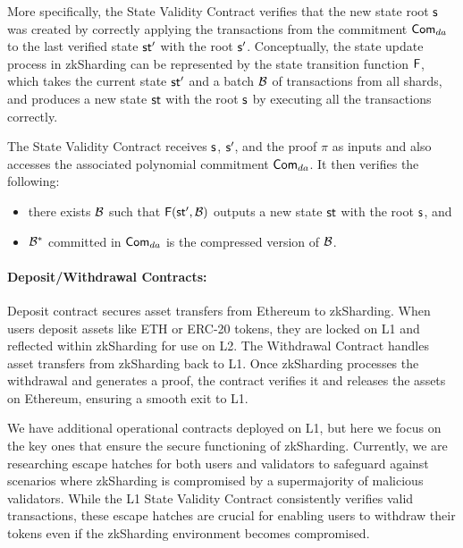 More specifically, the State Validity Contract verifies that the new state
root $\mathsf{s}$ was created by correctly applying the transactions from the
commitment $\mathsf{Com}_{da}$ to the last verified state $\mathsf{st}'$ with the root
$\mathsf{s}'$. Conceptually, the state update process in zkSharding can be
represented by the state transition function $\mathsf{F}$, which takes the
current state $\mathsf{st}'$ and a batch $\mathcal{B}$ of transactions from all shards,
and produces a new state $\mathsf{st}$ with the root $\mathsf{s}$ by executing all
the transactions correctly.

The State Validity Contract receives $\mathsf{s}$, $\mathsf{s}'$, and the proof
$\pi$ as inputs and also accesses the associated polynomial commitment
$\mathsf{Com}_{da}$. It then verifies the following:

\begin{itemize}
	\item there exists $\mathcal{B}$ such that $\mathsf{F}(\mathsf{st}', \mathcal{B})$
	      outputs a new state $\mathsf{st}$ with the root $\mathsf{s}$, and
	\item $\mathcal{B}^*$ committed in $\mathsf{Com}_{da}$ is the compressed version of
	      $\mathcal{B}$.
\end{itemize}

\paragraph{Deposit/Withdrawal Contracts:}
Deposit contract secures asset transfers from Ethereum to
zkSharding.
When users deposit assets like ETH or ERC-20 tokens, they are
locked on L1
and reflected within zkSharding for use on L2.
The Withdrawal Contract handles asset transfers from zkSharding
back to L1. Once zkSharding processes the withdrawal and generates
a
proof, the contract verifies it and releases the assets on
Ethereum,
ensuring a smooth exit to L1.

We have additional operational contracts deployed on L1, but here we focus
on the key ones that ensure the secure functioning of zkSharding.
\short{
}
{
	Currently, we are researching escape hatches for both users and
	validators
	to safeguard against scenarios where zkSharding is compromised by
	a
	supermajority of malicious validators. While the L1 State Validity
	Contract consistently verifies valid transactions, these escape
	hatches
	are crucial for enabling users to withdraw their tokens even if
	the
	zkSharding environment becomes compromised.
}
